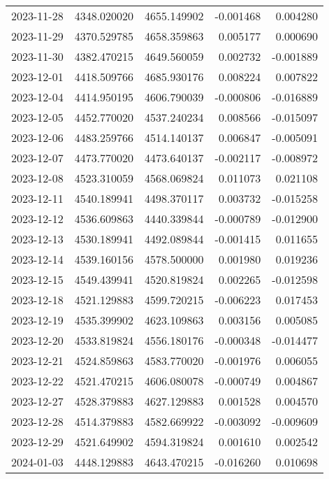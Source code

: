 \begin{tabular}{lrrrr}
2023-11-28 & 4348.020020 & 4655.149902 &       -0.001468 &     0.004280 \\
2023-11-29 & 4370.529785 & 4658.359863 &        0.005177 &     0.000690 \\
2023-11-30 & 4382.470215 & 4649.560059 &        0.002732 &    -0.001889 \\
2023-12-01 & 4418.509766 & 4685.930176 &        0.008224 &     0.007822 \\
2023-12-04 & 4414.950195 & 4606.790039 &       -0.000806 &    -0.016889 \\
2023-12-05 & 4452.770020 & 4537.240234 &        0.008566 &    -0.015097 \\
2023-12-06 & 4483.259766 & 4514.140137 &        0.006847 &    -0.005091 \\
2023-12-07 & 4473.770020 & 4473.640137 &       -0.002117 &    -0.008972 \\
2023-12-08 & 4523.310059 & 4568.069824 &        0.011073 &     0.021108 \\
2023-12-11 & 4540.189941 & 4498.370117 &        0.003732 &    -0.015258 \\
2023-12-12 & 4536.609863 & 4440.339844 &       -0.000789 &    -0.012900 \\
2023-12-13 & 4530.189941 & 4492.089844 &       -0.001415 &     0.011655 \\
2023-12-14 & 4539.160156 & 4578.500000 &        0.001980 &     0.019236 \\
2023-12-15 & 4549.439941 & 4520.819824 &        0.002265 &    -0.012598 \\
2023-12-18 & 4521.129883 & 4599.720215 &       -0.006223 &     0.017453 \\
2023-12-19 & 4535.399902 & 4623.109863 &        0.003156 &     0.005085 \\
2023-12-20 & 4533.819824 & 4556.180176 &       -0.000348 &    -0.014477 \\
2023-12-21 & 4524.859863 & 4583.770020 &       -0.001976 &     0.006055 \\
2023-12-22 & 4521.470215 & 4606.080078 &       -0.000749 &     0.004867 \\
2023-12-27 & 4528.379883 & 4627.129883 &        0.001528 &     0.004570 \\
2023-12-28 & 4514.379883 & 4582.669922 &       -0.003092 &    -0.009609 \\
2023-12-29 & 4521.649902 & 4594.319824 &        0.001610 &     0.002542 \\
2024-01-03 & 4448.129883 & 4643.470215 &       -0.016260 &     0.010698 \\

\end{tabular}
